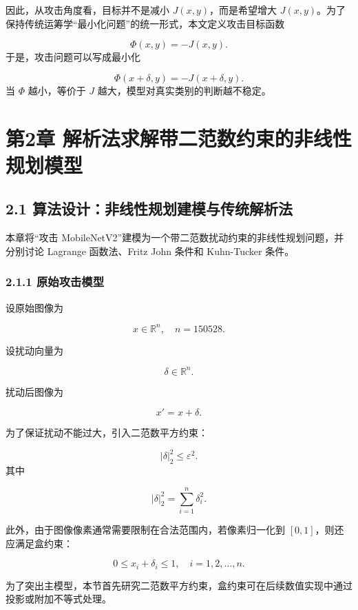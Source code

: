 ﻿\documentclass[UTF8,zihao=-4,fontset=none]{ctexart}
\begin{document}
因此，从攻击角度看，目标并不是减小 \(J(x,y)\)，而是希望增大 \(J(x,y)\)。为了保持传统运筹学“最小化问题”的统一形式，本文定义攻击目标函数

\[
\Phi(x,y)=-J(x,y).
\]
\noindent 于是，攻击问题可以写成最小化

\[
\Phi(x+\delta,y)
=
-J(x+\delta,y).
\]
\noindent 当 \(\Phi\) 越小，等价于 \(J\) 越大，模型对真实类别的判断越不稳定。

\clearpage
\section*{第2章 解析法求解带二范数约束的非线性规划模型}
{}

\subsection*{2.1 算法设计：非线性规划建模与传统解析法}
{}

本章将“攻击 MobileNetV2”建模为一个带二范数扰动约束的非线性规划问题，并分别讨论 Lagrange 函数法、Fritz John 条件和 Kuhn-Tucker 条件。

\subsubsection*{2.1.1 原始攻击模型}
{}

设原始图像为

\[
x\in\mathbb{R}^n,
\quad n=150528.
\]

设扰动向量为

\[
\delta\in\mathbb{R}^n.
\]

扰动后图像为

\[
x'=x+\delta.
\]

为了保证扰动不能过大，引入二范数平方约束：

\[
|\delta|_2^2\le \varepsilon^2.
\]
\noindent 其中

\[
|\delta|_2^2
=
\sum_{i=1}^{n}\delta_i^2.
\]

此外，由于图像像素通常需要限制在合法范围内，若像素归一化到 \([0,1]\)，则还应满足盒约束：

\[
0\le x_i+\delta_i\le 1,
\quad i=1,2,\ldots,n.
\]

为了突出主模型，本节首先研究二范数平方约束，盒约束可在后续数值实现中通过投影或附加不等式处理。
\end{document}
